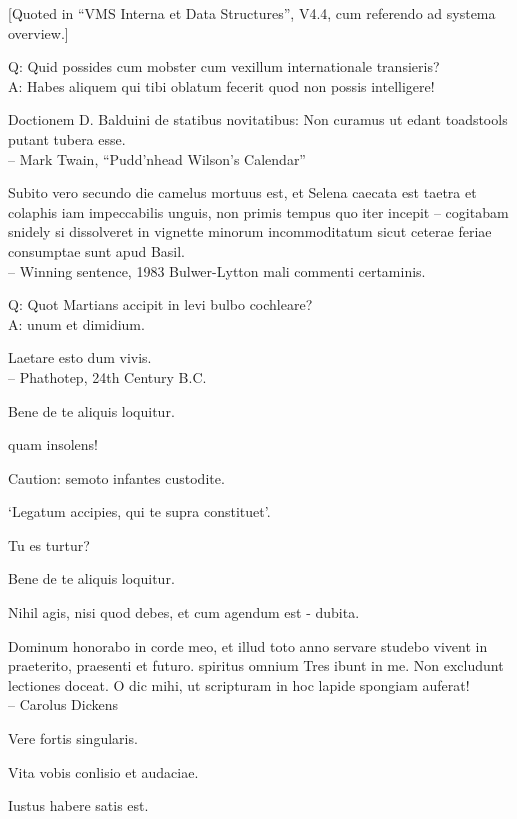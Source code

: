 \documentclass[titlepage,12pt]{memoir}
\begin{document}
[Quoted in “VMS Interna et Data Structures”, V4.4, cum
referendo ad systema overview.]

Q: Quid possides cum mobster cum vexillum internationale transieris?\\
A: Habes aliquem qui tibi oblatum fecerit quod non possis intelligere!

Doctionem D. Balduini de statibus novitatibus: Non curamus ut edant toadstools
putant tubera esse.
\\-- Mark Twain, “Pudd’nhead Wilson’s Calendar”

Subito vero secundo die camelus mortuus est, et Selena caecata est
taetra et colaphis iam impeccabilis unguis, non primis
tempus quo iter incepit -- cogitabam snidely si dissolveret
in vignette minorum incommoditatum sicut ceterae feriae consumptae sunt
apud Basil.
\\-- Winning sentence, 1983 Bulwer-Lytton mali commenti certaminis.

Q: Quot Martians accipit in levi bulbo cochleare?\\
A: unum et dimidium.

Laetare esto dum vivis.
\\-- Phathotep, 24th Century B.C.

 Bene de te aliquis loquitur.

quam insolens!

Caution: semoto infantes custodite.

‘Legatum accipies, qui te supra constituet’.

Tu es turtur?

 Bene de te aliquis loquitur.

Nihil agis, nisi quod debes, et cum agendum est - dubita.

Dominum honorabo in corde meo, et illud toto anno servare studebo
vivent in praeterito, praesenti et futuro. spiritus omnium
Tres ibunt in me. Non excludunt lectiones
doceat. O dic mihi, ut scripturam in hoc lapide spongiam auferat!
\\-- Carolus Dickens

Vere fortis singularis.

Vita vobis conlisio et audaciae.

Iustus habere satis est.
\end{document}
